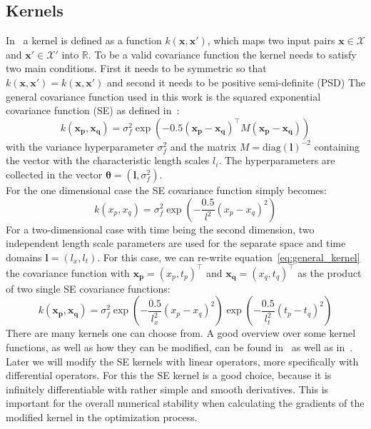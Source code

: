 \documentclass{article}
\begin{document}
\subsection{Kernels} \label{subsec: Kernels}
In~\cite{RasmussenCarlEdward} a kernel is defined as a function
$k(\bm{x},\bm{x'})$, which maps two input pairs $\bm{x} \in \mathcal{X}$ and
$\bm{x'} \in \mathcal{X'}$ into $\mathbb{R}$. To be a valid covariance function
the kernel needs to satisfy two main conditions. First it needs to be symmetric
so that $k(\bm{x,x'}) = k(\bm{x,x'})$ and second it needs to be positive
semi-definite (PSD) The general covariance function used in this work is the
squared exponential covariance function (SE) as defined
in~\cite{RasmussenCarlEdward}:
\begin{equation}
    k(\bm{x_p}, \bm{x_q}) = \sigma_f^2  \exp({-0.5{(\bm{x_p}-\bm{x_q} )}^\intercal M (\bm{x_p}- \bm{x_q})})
\end{equation}
with the variance hyperparameter $\sigma_f^2$ and the matrix $M = {\mathrm{diag}(\bm{l})}^{-2}$ containing the vector with the characteristic length scales $l_i$. The hyperparameters are collected in the vector $\bm{\theta} = (\bm{l},\sigma_f^2)$. \\
For the one dimensional case the SE covariance function simply becomes:
\begin{equation}
    k(x_p, x_q) = \sigma_f^2  \exp\left({-\frac{0.5}{l^2} {(x_p-x_q)}^2}\right)
\end{equation}
For a two-dimensional case with time being the second dimension, two independent length scale parameters are used for the separate space and time domains $\bm{l} = (l_x,l_t)$. For this case, we can re-write equation~\ref{eq:general_kernel} the covariance function with $\bm{x_p} = {(x_p, t_p)}^\intercal$ and  $\bm{x_q} = {(x_q, t_q)}^\intercal$ as the product of two single SE covariance functions:
\begin{equation}
    k(\bm{x_p}, \bm{x_q}) = \sigma_f^2  \exp\left({-\frac{0.5}{l_x^2} {(x_p-x_q)}^2}\right) \exp\left({-\frac{0.5}{l_t^2} {(t_p-t_q)}^2}\right)
\end{equation}
There are many kernels one can choose from. A good overview over some kernel functions, as well as how they can be modified, can be found in~\cite{Duvenaud} as well as in~\cite{görtler2019a}. Later we will modify the SE kernels with linear operators, more specifically with differential operators. For this the SE kernel is a good choice, because it is infinitely differentiable with rather simple and smooth derivatives. This is important for the overall numerical stability when calculating the gradients of the modified kernel in the optimization process.\\ 
\end{document}
